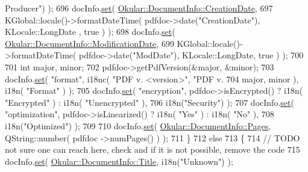 \begin{DoxyCode}
{      Producer"}) );
696             docInfo.\hyperlink{classOkular_1_1DocumentInfo_a8bd5403394ab192f1103cbf2a8e48d9b}{set}( \hyperlink{classOkular_1_1DocumentInfo_a3a6e5f7fb246e29bcb2e830b6f770791a58a72aeacd3cb08e85d0f9f19b2fe83a}{Okular::DocumentInfo::CreationDate},
697                          KGlobal::locale()->formatDateTime( pdfdoc->date(\textcolor{stringliteral}{"CreationDate"}), KLocale::LongDate
      , true ) );
698             docInfo.\hyperlink{classOkular_1_1DocumentInfo_a8bd5403394ab192f1103cbf2a8e48d9b}{set}( \hyperlink{classOkular_1_1DocumentInfo_a3a6e5f7fb246e29bcb2e830b6f770791a0191dfd9c2c5b7f210a641b082a23969}{Okular::DocumentInfo::ModificationDate},
699                          KGlobal::locale()->formatDateTime( pdfdoc->date(\textcolor{stringliteral}{"ModDate"}), KLocale::LongDate, 
      true ) );
700 
701             \textcolor{keywordtype}{int} major, minor;
702             pdfdoc->getPdfVersion(&major, &minor);
703             docInfo.\hyperlink{classOkular_1_1DocumentInfo_a8bd5403394ab192f1103cbf2a8e48d9b}{set}( \textcolor{stringliteral}{"format"}, i18nc( \textcolor{stringliteral}{"PDF v. <version>"}, \textcolor{stringliteral}{"PDF v. %
704                          major, minor ), i18n( \textcolor{stringliteral}{"Format"} ) );
705             docInfo.\hyperlink{classOkular_1_1DocumentInfo_a8bd5403394ab192f1103cbf2a8e48d9b}{set}( \textcolor{stringliteral}{"encryption"}, pdfdoc->isEncrypted() ? i18n( \textcolor{stringliteral}{"Encrypted"} ) : i18n( \textcolor{stringliteral}{"Unencrypted"}
       ),
706                          i18n(\textcolor{stringliteral}{"Security"}) );
707             docInfo.\hyperlink{classOkular_1_1DocumentInfo_a8bd5403394ab192f1103cbf2a8e48d9b}{set}( \textcolor{stringliteral}{"optimization"}, pdfdoc->isLinearized() ? i18n( \textcolor{stringliteral}{"Yes"} ) : i18n( \textcolor{stringliteral}{"No"} ),
708                          i18n(\textcolor{stringliteral}{"Optimized"}) );
709 
710             docInfo.\hyperlink{classOkular_1_1DocumentInfo_a8bd5403394ab192f1103cbf2a8e48d9b}{set}( \hyperlink{classOkular_1_1DocumentInfo_a3a6e5f7fb246e29bcb2e830b6f770791ac4706afb6f17aac2a6da24699cbd7360}{Okular::DocumentInfo::Pages}, QString::number( pdfdoc
      ->numPages() ) );
711         \}
712         \textcolor{keywordflow}{else}
713         \{
714             \textcolor{comment}{// TODO not sure one can reach here, check and if it is not possible, remove the code}
715             docInfo.\hyperlink{classOkular_1_1DocumentInfo_a8bd5403394ab192f1103cbf2a8e48d9b}{set}( \hyperlink{classOkular_1_1DocumentInfo_a3a6e5f7fb246e29bcb2e830b6f770791ae400626d63f14b61c55bd22aca9481e0}{Okular::DocumentInfo::Title}, i18n(\textcolor{stringliteral}{"Unknown"}) );
}
\end{DoxyCode}
